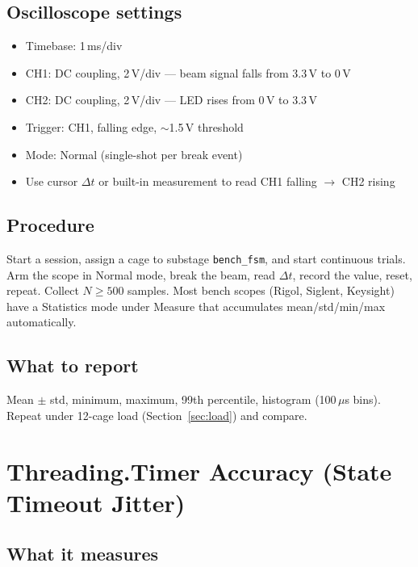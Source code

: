 \documentclass[11pt, a4paper]{article}
\begin{document}
\subsection*{Oscilloscope settings}

\begin{itemize}[noitemsep]
    \item Timebase: 1\,ms/div
    \item CH1: DC coupling, 2\,V/div --- beam signal falls from 3.3\,V to 0\,V
    \item CH2: DC coupling, 2\,V/div --- LED rises from 0\,V to 3.3\,V
    \item Trigger: CH1, falling edge, $\sim$1.5\,V threshold
    \item Mode: Normal (single-shot per break event)
    \item Use cursor $\Delta t$ or built-in measurement to read CH1 falling
          $\rightarrow$ CH2 rising
\end{itemize}

\subsection*{Procedure}

Start a session, assign a cage to substage \texttt{bench\_fsm}, and start
continuous trials. Arm the scope in Normal mode, break the beam, read
$\Delta t$, record the value, reset, repeat. Collect $N \geq 500$ samples.
Most bench scopes (Rigol, Siglent, Keysight) have a Statistics mode under
Measure that accumulates mean/std/min/max automatically.

\subsection*{What to report}

Mean $\pm$ std, minimum, maximum, 99th percentile, histogram (100\,$\mu$s bins).
Repeat under 12-cage load (Section~\ref{sec:load}) and compare.

\newpage

\section{Threading.Timer Accuracy (State Timeout Jitter)}

\subsection*{What it measures}
\end{document}
